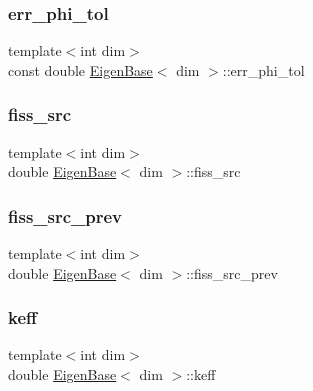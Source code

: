 \subsubsection{\texorpdfstring{err\+\_\+phi\+\_\+tol}{err\_phi\_tol}}
{\footnotesize\ttfamily template$<$int dim$>$ \\
const double \hyperlink{class_eigen_base}{Eigen\+Base}$<$ dim $>$\+::err\+\_\+phi\+\_\+tol\hspace{0.3cm}{\ttfamily [protected]}}

\mbox{\label{class_eigen_base_a6fa0753510038439c30de5c1832e4ebc}} 
\subsubsection{\texorpdfstring{fiss\+\_\+src}{fiss\_src}}
{\footnotesize\ttfamily template$<$int dim$>$ \\
double \hyperlink{class_eigen_base}{Eigen\+Base}$<$ dim $>$\+::fiss\+\_\+src\hspace{0.3cm}{\ttfamily [protected]}}

\mbox{\label{class_eigen_base_aa324e40bd20edd51659416da3220d295}} 
\subsubsection{\texorpdfstring{fiss\+\_\+src\+\_\+prev}{fiss\_src\_prev}}
{\footnotesize\ttfamily template$<$int dim$>$ \\
double \hyperlink{class_eigen_base}{Eigen\+Base}$<$ dim $>$\+::fiss\+\_\+src\+\_\+prev\hspace{0.3cm}{\ttfamily [protected]}}

\mbox{\label{class_eigen_base_a9373e0bd7462b70829d88b82cb66ac10}} 
\subsubsection{\texorpdfstring{keff}{keff}}
{\footnotesize\ttfamily template$<$int dim$>$ \\
double \hyperlink{class_eigen_base}{Eigen\+Base}$<$ dim $>$\+::keff\hspace{0.3cm}{\ttfamily [protected]}}

